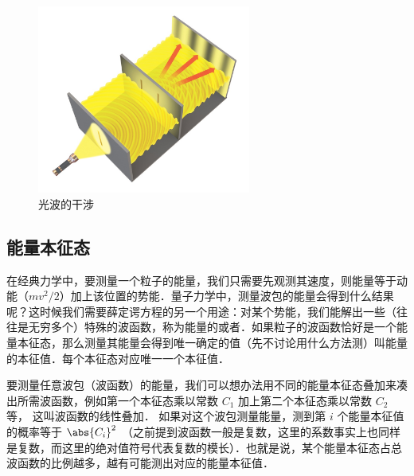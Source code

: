 \begin{figure}[ht]
\centering
\includegraphics[width=7cm]{./figures/QM07.png}
\caption{光波的干涉} \label{QM0_fig7}
\end{figure}


\subsection{能量本征态}
在经典力学中，要测量一个粒子的能量，我们只需要先观测其速度，则能量等于动能（$mv^2/2$）加上该位置的势能．量子力学中，测量波包的能量会得到什么结果呢？这时候我们需要薛定谔方程的另一个用途：对某个势能，我们能解出一些（往往是无穷多个）特殊的波函数，称为能量的或者．如果粒子的波函数恰好是一个能量本征态，那么测量其能量会得到唯一确定的值（先不讨论用什么方法测）叫能量的本征值．每个本征态对应唯一一个本征值．

要测量任意波包（波函数）的能量，我们可以想办法用不同的能量本征态叠加来凑出所需波函数，例如第一个本征态乘以常数 $C_1$ 加上第二个本征态乘以常数 $C_2$ 等， 这叫波函数的线性叠加． 如果对这个波包测量能量，测到第 $i$ 个能量本征值的概率等于 $\abs{C_i}^2$ （之前提到波函数一般是复数，这里的系数事实上也同样是复数，而这里的绝对值符号代表复数的模长）．也就是说，某个能量本征态占总波函数的比例越多，越有可能测出对应的能量本征值．



